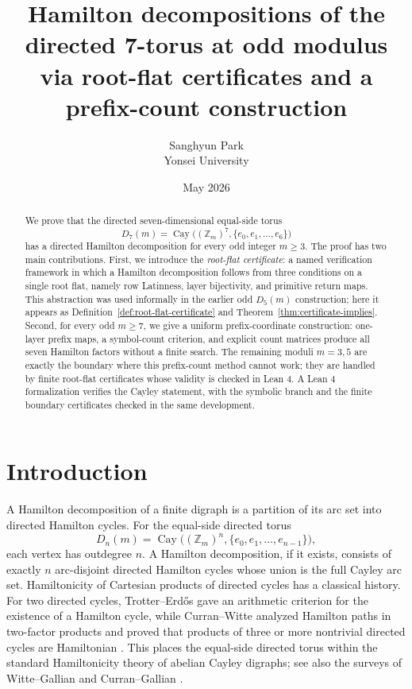 \documentclass[11pt]{article}
\title{Hamilton decompositions of the directed 7-torus at odd modulus via root-flat certificates and a prefix-count construction}
\author{Sanghyun Park\\Yonsei University}
\date{May 2026}
\theoremstyle{definition}
\newcommand{\Cay}{\operatorname{Cay}}
\begin{document}
\maketitle

\begin{abstract}
We prove that the directed seven-dimensional equal-side torus
\[
D_7(m)=\Cay\bigl((\mathbb Z_m)^7,\{e_0,e_1,\ldots,e_6\}\bigr)
\]
has a directed Hamilton decomposition for every odd integer \(m\ge3\).  The proof has two
main contributions.  First, we introduce the \emph{root-flat certificate}: a named verification framework in which a Hamilton
decomposition follows from three conditions on a single root flat, namely row Latinness,
layer bijectivity, and primitive return maps.  This abstraction was used informally in the earlier odd
\(D_5(m)\) construction; here it appears as Definition~\ref{def:root-flat-certificate} and Theorem~\ref{thm:certificate-implies}.  Second, for every odd
\(m\ge7\), we give a uniform prefix-coordinate construction: one-layer prefix maps, a symbol-count
criterion, and explicit count matrices produce all seven Hamilton factors without a finite search.
The remaining moduli \(m=3,5\) are exactly the boundary where this prefix-count method cannot
work; they are handled by finite root-flat certificates whose validity is checked in Lean 4.  A Lean 4 formalization verifies the Cayley statement, with the symbolic branch and the finite boundary certificates checked in the same development.
\end{abstract}

\section{Introduction}

A Hamilton decomposition of a finite digraph is a partition of its arc set into directed Hamilton
cycles.  For the equal-side directed torus
\[
D_n(m)=\Cay\bigl((\mathbb Z_m)^n,\{e_0,e_1,\ldots,e_{n-1}\}\bigr),
\]
each vertex has outdegree \(n\).  A Hamilton decomposition, if it exists, consists of exactly
\(n\) arc-disjoint directed Hamilton cycles whose union is the full Cayley arc set.  Hamiltonicity of Cartesian products of directed cycles has a classical history.  For two directed cycles,
Trotter--Erd\H{o}s gave an arithmetic criterion for the existence of a Hamilton cycle, while
Curran--Witte analyzed Hamilton paths in two-factor products and proved that products of three or more
nontrivial directed cycles are Hamiltonian \cite{TrotterErdos,CurranWitte}.  This places the equal-side
directed torus within the standard Hamiltonicity theory of abelian Cayley digraphs; see also the surveys
of Witte--Gallian and Curran--Gallian \cite{WitteGallian,CurranGallian}.
\end{document}
